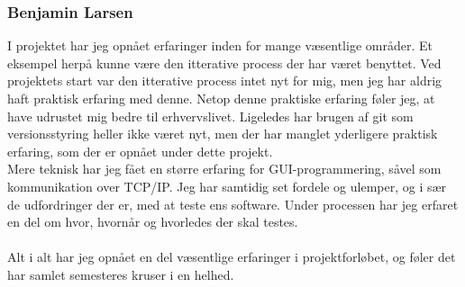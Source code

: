 \subsubsection{Benjamin Larsen}
I projektet har jeg opnået erfaringer inden for mange væsentlige områder. Et eksempel herpå kunne være den itterative process der har været benyttet. Ved projektets start var den itterative process intet nyt for mig, men jeg har aldrig haft praktisk erfaring med denne. Netop denne praktiske erfaring føler jeg, at have udrustet mig bedre til erhvervslivet. Ligeledes har brugen af git som versionsstyring heller ikke været nyt, men der har manglet yderligere praktisk erfaring, som der er opnået under dette projekt.\\
Mere teknisk har jeg fået en større erfaring for GUI-programmering, såvel som kommunikation over TCP/IP. Jeg har samtidig set fordele og ulemper, og i sær de udfordringer der er, med at teste ens software. Under processen har jeg erfaret en del om hvor, hvornår og hvorledes der skal testes.\\\\
Alt i alt har jeg opnået en del væsentlige erfaringer i projektforløbet, og føler det har samlet semesteres kruser i en helhed.